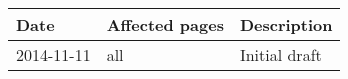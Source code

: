 
\begin{tabularx}{\textwidth}{llX}
\toprule
\textbf{Date} & \textbf{Affected pages} & \textbf{Description} \\
\midrule

2014-11-11 & all & Initial draft \\
\bottomrule
\end{tabularx}

